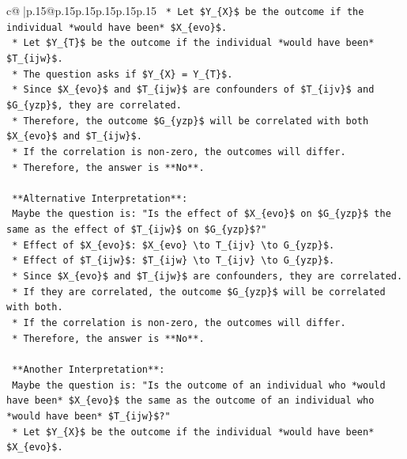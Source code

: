 \documentclass{article}
\begin{document}
{\begin{supertabular}{c@{$\;$}|p{.15\linewidth}@{}p{.15\linewidth}p{.15\linewidth}p{.15\linewidth}p{.15\linewidth}p{.15\linewidth}}
{{{\texttt{        *   Let \$Y\_\{X\}\$ be the outcome if the individual *would have been* \$X\_\{evo\}\$.} \\
\texttt{        *   Let \$Y\_\{T\}\$ be the outcome if the individual *would have been* \$T\_\{ijw\}\$.} \\
\texttt{        *   The question asks if \$Y\_\{X\} = Y\_\{T\}\$.} \\
\texttt{        *   Since \$X\_\{evo\}\$ and \$T\_\{ijw\}\$ are confounders of \$T\_\{ijv\}\$ and \$G\_\{yzp\}\$, they are correlated.} \\
\texttt{        *   Therefore, the outcome \$G\_\{yzp\}\$ will be correlated with both \$X\_\{evo\}\$ and \$T\_\{ijw\}\$.} \\
\texttt{        *   If the correlation is non{-}zero, the outcomes will differ.} \\
\texttt{        *   Therefore, the answer is **No**.} \\
\\ 
\texttt{    **Alternative Interpretation**:} \\
\texttt{    Maybe the question is: "Is the effect of \$X\_\{evo\}\$ on \$G\_\{yzp\}\$ the same as the effect of \$T\_\{ijw\}\$ on \$G\_\{yzp\}\$?"} \\
\texttt{    *   Effect of \$X\_\{evo\}\$: \$X\_\{evo\} \textbackslash{}to T\_\{ijv\} \textbackslash{}to G\_\{yzp\}\$.} \\
\texttt{    *   Effect of \$T\_\{ijw\}\$: \$T\_\{ijw\} \textbackslash{}to T\_\{ijv\} \textbackslash{}to G\_\{yzp\}\$.} \\
\texttt{    *   Since \$X\_\{evo\}\$ and \$T\_\{ijw\}\$ are confounders, they are correlated.} \\
\texttt{    *   If they are correlated, the outcome \$G\_\{yzp\}\$ will be correlated with both.} \\
\texttt{    *   If the correlation is non{-}zero, the outcomes will differ.} \\
\texttt{    *   Therefore, the answer is **No**.} \\
\\ 
\texttt{    **Another Interpretation**:} \\
\texttt{    Maybe the question is: "Is the outcome of an individual who *would have been* \$X\_\{evo\}\$ the same as the outcome of an individual who *would have been* \$T\_\{ijw\}\$?"} \\
\texttt{    *   Let \$Y\_\{X\}\$ be the outcome if the individual *would have been* \$X\_\{evo\}\$.} \\
}}}
\end{supertabular}}
\end{document}
